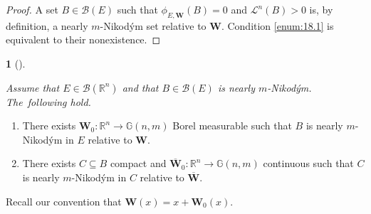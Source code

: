 \documentclass[11pt]{article}
\newcounter{cdrthm}[section]
\theoremstyle{definition}
\theoremstyle{jepanonymous}
\newtheorem{jepempty}[cdrthm]{}
\newenvironment{enonce}[2][remark]{\begin{jepempty}[#2]}{\end{jepempty}}
\theoremstyle{plain}
\newenvironment{Empty}[2][\null]{%
\begin{enonce}[remark]{#1}#2}
{\end{enonce}}
\newcommand{\R}{\mathbb{R}}
\newcommand{\Rn}{\R^n}
\newcommand{\calB}{\mathscr{B}}
\newcommand{\calL}{\mathscr{L}}
\newcommand{\bW}{{\boldsymbol{W}}}
\newcommand{\bG}{\mathbb{G}}
\let\subset\subseteq
\begin{document}
\begin{proof}
A set $B \in \calB(E)$ such that $\phi_{E,\bW}(B)=0$ and $\calL^n(B) > 0$ is, by definition, a nearly $m$-Nikod\'ym set relative to $\bW$.
Condition \eqref{enum:18.1} is equivalent to their nonexistence.
\end{proof}

\begin{Empty}[]
\label{nik.set}
{\it
Assume that $E \in \calB(\Rn)$ and that $B \in \calB(E)$ is nearly $m$-Nikod\'ym. The~fol\-lowing hold.
\begin{enumerate}
\item\label{enum:19.1} There exists $\bW_0: \Rn \to \bG(n,m)$ Borel measurable such that $B$ is nearly $m$\nobreakdash-Nikod\'ym in $E$ relative to $\bW$.
\item\label{enum:19.2} There exists $C \subset B$ compact and $\overline{\bW}_0: \Rn \to \bG(n,m)$ continuous such that $C$ is nearly $m$-Nikod\'ym in $C$ relative to $\overline{\bW}$.
\end{enumerate}
Recall our convention that $\bW(x) = x + \bW_0(x)$.
}
\end{Empty}
\end{document}
